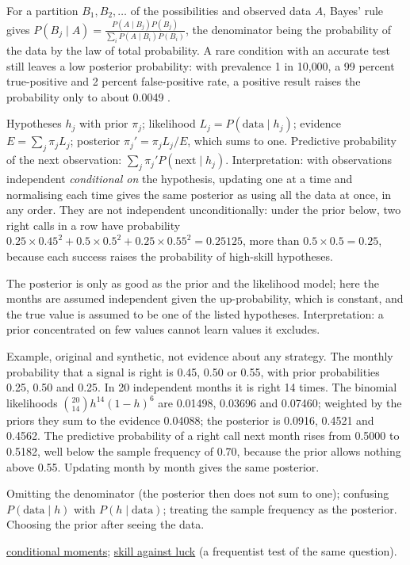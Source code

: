 \begin{qfmethod}\label{meth:bayesian-updating}
 For a partition $B_1,B_2,\dots$ of the possibilities and observed data $A$, Bayes' rule gives $P(B_j\mid A)=\frac{P(A\mid B_j)P(B_j)}{\sum_iP(A\mid B_i)P(B_i)}$, the denominator being the probability of the data by the law of total probability. A rare condition with an accurate test still leaves a low posterior probability: with prevalence 1 in 10{,}000, a 99 percent true-positive and 2 percent false-positive rate, a positive result raises the probability only to about 0.0049 \citep[sec.~1.4.3]{probability-statistics-random-processes}.

 Hypotheses $h_j$ with prior $\pi_j$; likelihood $L_j=P(\text{data}\mid h_j)$; evidence $E=\sum_j\pi_jL_j$; posterior $\pi_j'=\pi_jL_j/E$, which sums to one. Predictive probability of the next observation: $\sum_j\pi_j'P(\text{next}\mid h_j)$. Interpretation: with observations independent \emph{conditional on} the hypothesis, updating one at a time and normalising each time gives the same posterior as using all the data at once, in any order. They are not independent unconditionally: under the prior below, two right calls in a row have probability $0.25\times0.45^2+0.5\times0.5^2+0.25\times0.55^2=0.25125$, more than $0.5\times0.5=0.25$, because each success raises the probability of high-skill hypotheses.

 The posterior is only as good as the prior and the likelihood model; here the months are assumed independent given the up-probability, which is constant, and the true value is assumed to be one of the listed hypotheses. Interpretation: a prior concentrated on few values cannot learn values it excludes.

 Example, original and synthetic, not evidence about any strategy. The monthly probability that a signal is right is 0.45, 0.50 or 0.55, with prior probabilities 0.25, 0.50 and 0.25. In 20 independent months it is right 14 times. The binomial likelihoods $\binom{20}{14}h^{14}(1-h)^6$ are 0.01498, 0.03696 and 0.07460; weighted by the priors they sum to the evidence 0.04088; the posterior is 0.0916, 0.4521 and 0.4562. The predictive probability of a right call next month rises from 0.5000 to 0.5182, well below the sample frequency of 0.70, because the prior allows nothing above 0.55. Updating month by month gives the same posterior.

 Omitting the denominator (the posterior then does not sum to one); confusing $P(\text{data}\mid h)$ with $P(h\mid\text{data})$; treating the sample frequency as the posterior. Choosing the prior after seeing the data.

 \hyperref[def:conditional-moments]{conditional moments}; \hyperref[meth:skill-luck-significance-tests]{skill against luck} (a frequentist test of the same question).

\end{qfmethod}
